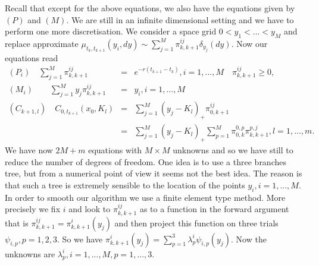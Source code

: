 \documentclass[a4paper]{article}
\begin{document}
Recall that except for the above equations, we also have the
equations given by $(P)$ and $(M)$. We are still in an infinite
dimensional setting and we have to perform one more
discretisation. We consider a space grid $0<y_{1}<...<y_{M}$ and
replace approximate $\mu _{t_{k},t_{k+1}}(y_{i},dy)\sim
\sum_{j=1}^{M}\pi _{k,k+1}^{ij}\delta _{y_{j}}(dy).$ Now our
equations read
\begin{eqnarray*}
(P_{i})\quad \sum_{j=1}^{M}\pi _{k,k+1}^{ij}
&=&e^{-r(t_{k+1}-t_{k})},i=1,...,M\quad \pi _{k,k+1}^{ij}\geq 0, \\
(M_{i})\quad \quad \sum_{j=1}^{M}y_{j}\pi _{k,k+1}^{ij} &=&y_{i},i=1,...,M \\
(C_{k+1,l})\quad C_{0,t_{k+1}}(x_{0},K_{l})
&=&\sum_{j=1}^{M}(y_{j}-K_{l})_{+}\pi _{0,k+1}^{ij} \\
&=&\sum_{j=1}^{M}(y_{j}-K_{l})_{+}\sum_{p=1}^{M}\pi
_{0,k}^{0,p}\pi _{k,k+1}^{p,j},l=1,...,m.
\end{eqnarray*}
We have now $2M+m$ equations with $M\times M$ unknowns and so we
have still to reduce the number of degrees of freedom. One idea is
to use a three branches tree, but from a numerical point of view
it seems not the best idea. The reason is that such a tree is
extremely sensible to the location of the points
$y_{i},i=1,...,M.$ In order to smooth our algorithm we use a
finite element type method. More precisely we fix $i$ and look to
$\pi _{k,k+1}^{ij}$ as to a function in the forward argument that
is $\pi _{k,k+1}^{ij}=\pi _{k,k+1}^{i}(y_{j})$ and then project
this function on three trials $\psi _{i,p},p=1,2,3.$ So we have
$\pi _{k,k+1}^{i}(y_{j})=\sum_{p=1}^{3}\lambda _{p}^{i}\psi
_{i,p}(y_{j}).$ Now the unknowns are $\lambda _{p}^{i},i=1
,...,M,p=1,...,3$.
\end{document}
